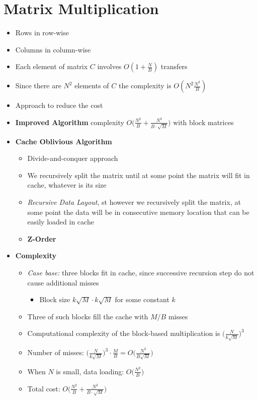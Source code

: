 \documentclass[12pt,oneside]{report}
\begin{document}
\section{Matrix Multiplication}
\begin{itemize}
    \item Rows in row-wise
    \item Columns in column-wise
    \item Each element of matrix \(C\) involves \(O(1+\frac{N}{B})\) transfers
    \item Since there are \(N^2\) elements of \(C\) the complexity is \(O(N^2 \frac{N^3}{B})\)
    \item Approach to reduce the cost
    \item \textbf{Improved Algorithm} complexity \(O\Big(\frac{N^2}{B} + \frac{N^3}{B \cdot \sqrt{M}}\Big)\) with block matrices

    \item \textbf{Cache Oblivious Algorithm}
    \begin{itemize}
        \item Divide-and-conquer approach
        \item We recursively split the matrix until at some point the matrix will fit in cache, whatever is its size
        \item \textit{Recursive Data Layout}, st however we recursively split the matrix, at some point the data will be in consecutive memory location that can be easily loaded in cache
        \item \textbf{Z-Order}
    \end{itemize}
    \item \textbf{Complexity}
    \begin{itemize}
        \item \textit{Case base:} three blocks fit in cache, since successive recursion step do not cause additional misses
        \begin{itemize}
            \item Block size \(k\sqrt{M} \cdot k\sqrt{M}\) for some constant \(k\)
        \end{itemize}
        \item Three of such blocks fill the cache with \(M/B\) misses
        \item Computational complexity of the block-based multiplication is \(\Big(\frac{N}{k\sqrt{M}}\Big)^3\)
        \item Number of misses: \(\Big(\frac{N}{k\sqrt{M}}\Big)^3 \cdot \frac{M}{B} = O\Big(\frac{N^3}{B\sqrt{M}}\Big)\)
        \item When \(N\) is small, data loading: \(O\Big(\frac{N^2}{B}\Big)\)
        \item Total cost: \(O\Big(\frac{N^2}{B} + \frac{N^3}{B \cdot \sqrt{M}}\Big)\)
    \end{itemize}
\end{itemize}
\end{document}
